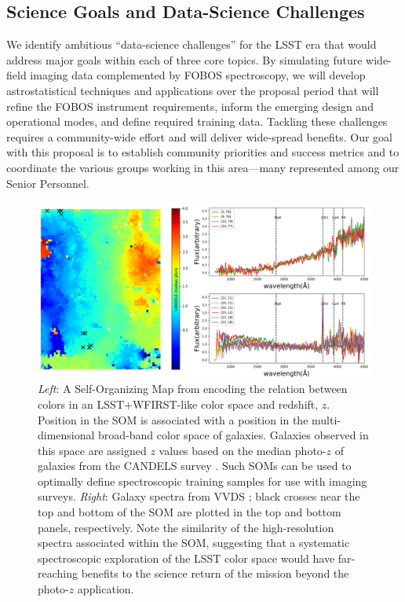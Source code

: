 \documentclass[oneside,11pt]{amsart}
\newcommand{\comment}[2][todo]{{\color{#1}[[{\bf #2}]]}}
\begin{document}
\subsection{Science Goals and Data-Science Challenges}
\label{sec:goals}

We identify ambitious ``data-science challenges'' for the LSST era that
would address major goals within each of three core topics.  By
simulating future wide-field imaging data complemented by FOBOS spectroscopy,
we will develop astrostatistical techniques and applications over the
proposal period that will refine the FOBOS instrument requirements,
inform the emerging design and operational modes, and define required
training data.  Tackling these challenges requires a community-wide
effort and will deliver wide-spread benefits.  Our goal with this
proposal is to establish community priorities and success metrics and to
coordinate the various groups working in this area---many represented
among our Senior Personnel.


\begin{figure}[h!]
%
\vskip -0.1in
%
\includegraphics[width=\textwidth]{figs/Hemmati18_Fig8_VVDS_spec.png}
%
\caption{\small {\it Left}: A Self-Organizing Map
\citep[SOM;][]{1990Natur.346...24K} from \citet{hemmati18} encoding the
relation between colors in an LSST+WFIRST-like color space and redshift,
$z$.  Position in the SOM is associated with a position in the
multi-dimensional broad-band color space of galaxies.  Galaxies observed
in this space are assigned $z$ values based on the median photo-$z$ of
galaxies from the CANDELS survey \citep[color
bar;][]{2011ApJS..197...35G}.  Such SOMs can be used to optimally define
spectroscopic training samples for use with imaging surveys.  {\it
Right}: Galaxy spectra from VVDS \citep{2005A&A...439..845L}; black
crosses near the top and bottom of the SOM are plotted in the top and
bottom panels, respectively.  Note the similarity of the high-resolution
spectra associated within the SOM, suggesting that a systematic
spectroscopic exploration of the LSST color space would have
far-reaching benefits to the science return of the mission beyond the
photo-$z$ application.}
%
\label{fig:SOM}
%
\end{figure}
\end{document}
